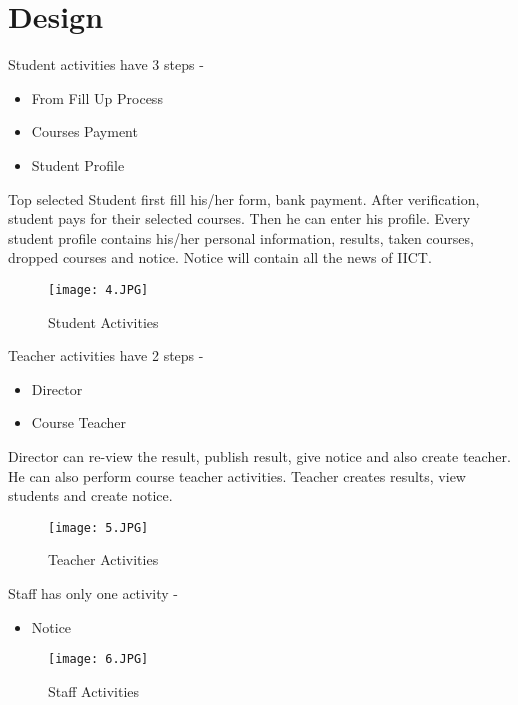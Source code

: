 \documentclass{scrreprt}
\begin{document}
    \section{Design}
    Student activities have 3 steps -
    \begin{itemize}
        \item From Fill Up Process
        \item Courses Payment
        \item Student Profile
    \end{itemize}
    Top selected Student first fill his/her form, bank payment. After verification, student pays for their selected courses. Then he can enter his profile.
    \newline
    Every student profile contains his/her personal information, results, taken courses, dropped courses and notice.
    \newline
    Notice will contain all the news of IICT.

    \begin{figure}[h!]
        \centering
        \texttt{[image: 4.JPG]}
        \caption{Student Activities}
        \label{fig:Students Activites}
    \end{figure}
    \newpage
    Teacher activities have 2 steps -
    \begin{itemize}
        \item Director
        \item Course Teacher
    \end{itemize}
    Director can re-view the result, publish result, give notice and also create teacher. He can also perform course teacher activities.
    \newline
    Teacher creates results, view students and create notice.
    \newline
    \begin{figure}[h!]
        \centering
        \texttt{[image: 5.JPG]}
        \caption{Teacher Activities}
        \label{fig:Teacher Activities}
    \end{figure}
    \newline
    Staff has only one activity -
    \begin{itemize}
        \item Notice
    \end{itemize}
    \begin{figure}[h!]
        \centering
        \texttt{[image: 6.JPG]}
        \caption{Staff Activities}
        \label{fig:Staff Activities}
    \end{figure}
\end{document}
